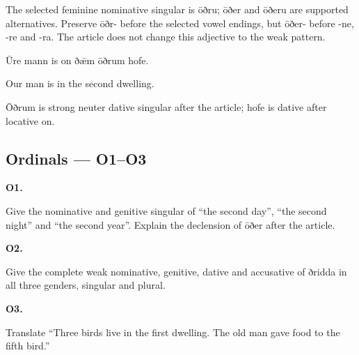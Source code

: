 The selected feminine nominative singular is ōðru; ōðer and ōðeru are supported alternatives. Preserve ōðr- before the selected vowel endings, but ōðer- before -ne, -re and -ra. The article does not change this adjective to the weak pattern.

Ūre mann is on ðǣm ōðrum hofe.

Our man is in the second dwelling.

Ōðrum is strong neuter dative singular after the article; hofe is dative after locative on.

\subsection*{Ordinals — O1–O3}

\par\begin{minipage}{\linewidth}\raggedright
\textbf{O1.}

Give the nominative and genitive singular of “the second day”, “the second night” and “the second year”. Explain the declension of ōðer after the article.

\end{minipage}\par\addvspace{4pt}

\par\begin{minipage}{\linewidth}\raggedright
\textbf{O2.}

Give the complete weak nominative, genitive, dative and accusative of ðridda in all three genders, singular and plural.

\end{minipage}\par\addvspace{4pt}

\par\begin{minipage}{\linewidth}\raggedright
\textbf{O3.}

Translate “Three birds live in the first dwelling. The old man gave food to the fifth bird.”

\end{minipage}\par\addvspace{4pt}

